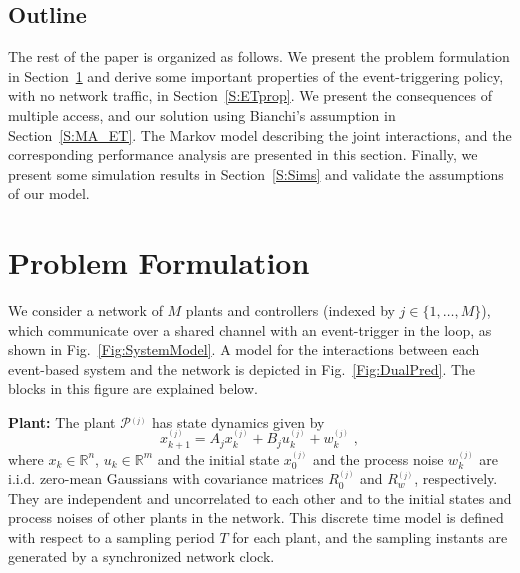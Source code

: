 \documentclass[journal]{IEEEtran}
\begin{document}
\begin{figure*}[tb]
 \caption{A network of $M$ event-based systems using a CRM to access the network, where the $j^\textrm{th}$ control loop is illustrated with its dependency on the other control loops $i \in \{1,\dots,M\}$, $i \neq j$. The events are generated by the state-based schedulers. The other control loops are represented with their state-based schedulers alone.} \label{Fig:SystemModel}
\end{figure*}

\subsection{Outline}
The rest of the paper is organized as follows. We present the problem formulation in Section~\ref{S:Problem} and derive some important properties of the event-triggering policy, with no network traffic, in Section~\ref{S:ETprop}. We present the consequences of multiple access, and our solution using Bianchi's assumption in Section~\ref{S:MA_ET}. The Markov model describing the joint interactions, and the corresponding performance analysis are presented in this section. Finally, we present some simulation results in Section~\ref{S:Sims} and validate the assumptions of our model.

\section{Problem Formulation} \label{S:Problem}

We consider a network of $M$ plants and controllers (indexed by $j \in \{1,\dots,M\}$), which communicate over a shared channel with an event-trigger in the loop, as shown in Fig.~\ref{Fig:SystemModel}. A model for the interactions between each event-based system and the network is depicted in Fig.~\ref{Fig:DualPred}. The blocks in this figure are explained below.

\noindent \textbf{Plant: } The plant $\mathcal{P}^{_{(j)}}$ has state dynamics given by
\begin{equation}
\label{Eq:StateSpace} x^{_{(j)}}_{k+1} = A_j x^{_{(j)}}_k + B_j u^{_{(j)}}_k + w^{_{(j)}}_k \; ,
\end{equation}
where $x_k \in \mathbb{R}^{n}$, $u_k \in \mathbb{R}^{m}$ and the initial state $x^{_{(j)}}_0$ and the process noise $w^{_{(j)}}_k$ are i.i.d. zero-mean Gaussians with covariance matrices $R^{_{(j)}}_0$ and $R^{_{(j)}}_w$, respectively. They are independent and uncorrelated to each other and to the initial states and process noises of other plants in the network. This discrete time model is defined with respect to a sampling period $T$ for each plant, and the sampling instants are generated by a synchronized network clock.
\end{document}
